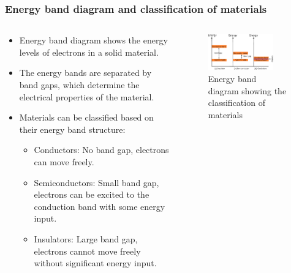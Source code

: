 \begin{frame}
	\frametitle{Energy band diagram and classification of materials}
    \begin{columns}
        \begin{column}{0.6\textwidth}
            \begin{itemize}
                \item Energy band diagram shows the energy levels of electrons in a solid material.
                \item The energy bands are separated by band gaps, which determine the electrical properties of the material.
                \item Materials can be classified based on their energy band structure:
                \begin{itemize}
                    \item Conductors: No band gap, electrons can move freely.
                    \item Semiconductors: Small band gap, electrons can be excited to the conduction band with some energy input.
                    \item Insulators: Large band gap, electrons cannot move freely without significant energy input.
                \end{itemize}
            \end{itemize}
    \end{column}
        \hfill
        \begin{column}{0.4\textwidth}
            \begin{figure}
                \centering
                \includegraphics[width=0.8\textwidth]{fig/lec02/band_diagram.pdf}
                \caption{Energy band diagram showing the classification of materials}
            \end{figure}
        \end{column}
\end{columns}
\end{frame}

